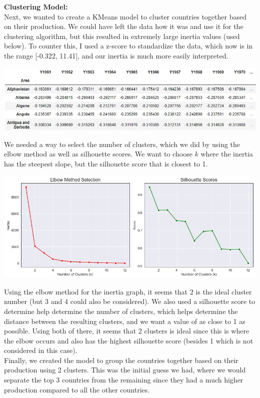 \documentclass[12pt, a4paper]{article}
\begin{document}
\begin{spacing}{1.1}

	\noindent \textbf{Clustering Model:}\\
	Next, we wanted to create a KMeans model to cluster countries together based on their production. We could have left the data how it was and use it for the clustering algorithm, but this resulted in extremely large inertia values (used below). To counter this, I used a z-score to standardize the data, which now is in the range [-0.322, 11.41], and our inertia is much more easily interpreted.
	\begin{center}
	\includegraphics[scale=.7]{prod_z}
	\end{center}
	We needed a way to select the number of clusters, which we did by using the elbow method as well as silhouette scores. We want to choose $k$ where the inertia has the steepest slope, but the silhouette score that is closest to 1.
	\begin{center}
	\includegraphics[scale=.7]{cluster_score}
	\end{center}
	Using the elbow method for the inertia graph, it seems that 2 is the ideal cluster number (but 3 and 4 could also be considered). We also used a silhouette score to determine help determine the number of clusters, which helps determine the distance between the resulting clusters, and we want a value of as close to 1 as possible. Using both of there, it seems that 2 clusters is ideal since this is where the elbow occurs and also has the highest silhouette score (besides 1 which is not considered in this case).\vspace*{2mm}\\	
	Finally, we created the model to group the countries together based on their production using 2 clusters. This was the initial guess we had, where we would separate the top 3 countries from the remaining since they had a much higher production compared to all the other countries. \newpage


\end{spacing}
\end{document}
